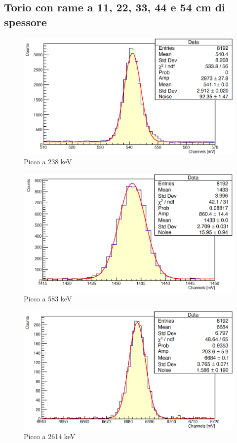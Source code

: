 \documentclass[a4paper,10pt]{article}
\begin{document}
\subsection{Torio con rame a 11, 22, 33, 44 e 54 cm di spessore}
\begin{figure}[H]
    \centering
    \includegraphics[scale=0.45]{appendice/spettri/ThCu1_11}
    \caption{Picco a 238 keV}
\end{figure}
\begin{figure}[H]
    \centering
    \includegraphics[scale=0.45]{appendice/spettri/ThCu2_11}
    \caption{Picco a 583 keV}
\end{figure}
\begin{figure}[H]
    \centering
    \includegraphics[scale=0.45]{appendice/spettri/ThCu3_11}
    \caption{Picco a 2614 keV}
\end{figure}
\end{document}
